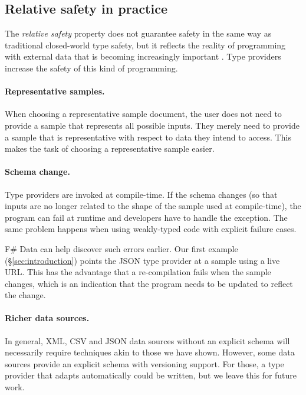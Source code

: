 \documentclass[10pt,nocopyrightspace]{sigplanconf}
\begin{document}
\subsection{Relative safety in practice}
\label{sec:safety-discuss}

The \emph{relative safety} property does not guarantee safety in the same way as traditional
closed-world type safety, but it reflects the reality of programming with external data that is
becoming increasingly important \cite{age-of-web}. Type providers increase the safety of this kind of
programming.

\paragraph{Representative samples.}
When choosing a representative sample document, the user does not need to provide a sample
that represents all possible inputs. They merely need to provide a sample that is representative
with respect to data they intend to access. This makes the task of choosing a representative
sample easier.

\paragraph{Schema change.}
Type providers are invoked at compile-time. If the schema changes (so that inputs are no longer
related to the shape of the sample used at compile-time), the program can fail at runtime and
developers have to handle the exception. The same problem happens when using weakly-typed code
with explicit failure cases.

F\# Data can help discover such errors earlier. Our first example (\S\ref{sec:introduction})
points the JSON type provider at a sample using a live URL. This has the advantage that a
re-compilation fails when the sample changes, which is an indication that the program needs to be
updated to reflect the change.

\paragraph{Richer data sources.}
In general, XML, CSV and JSON data sources without an explicit schema will necessarily require
techniques akin to those we have shown. However, some data sources provide an explicit schema with
versioning support. For those, a type provider that adapts automatically could be written,
but we leave this for future work.

\end{document}
